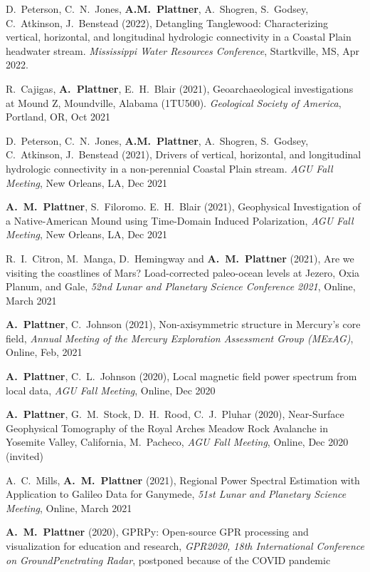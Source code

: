 \documentclass[10pt]{article}
\begin{document}
\spcp D.~Peterson, C.~N.~Jones, \textbf{A.M.~Plattner}, A.~Shogren,
S.~Godsey, C.~Atkinson, J.~Benstead (2022), Detangling Tanglewood:
Characterizing vertical, horizontal, and longitudinal hydrologic
connectivity in a Coastal Plain headwater stream. \emph{Mississippi
Water Resources Conference}, Startkville, MS, Apr 2022.

\spcp R.~Cajigas, \textbf{A.~Plattner}, E.~H.~Blair (2021),
Geoarchaeological investigations at Mound Z, Moundville, Alabama
(1TU500). \emph{Geological Society of America}, Portland, OR, Oct 2021

\spcp D.~Peterson, C.~N.~Jones, \textbf{A.M.~Plattner}, A.~Shogren,
S.~Godsey, C.~Atkinson, J.~Benstead (2021), Drivers of vertical,
horizontal, and longitudinal hydrologic connectivity in a
non-perennial Coastal Plain stream. \emph{AGU Fall Meeting}, New
Orleans, LA, Dec 2021

\spcp \textbf{A.~M.~Plattner}, S.~Filoromo. E.~H.~Blair (2021),
Geophysical Investigation of a Native-American Mound using Time-Domain
Induced Polarization, \emph{AGU Fall Meeting}, New Orleans, LA, Dec
2021

\spcp R.~I.~Citron, M.~Manga, D.~Hemingway and \textbf{A.~M.~Plattner}
(2021), Are we visiting the coastlines of Mars? Load-corrected
paleo-ocean levels at Jezero, Oxia Planum, and Gale, \emph{52nd Lunar
and Planetary Science Conference 2021}, Online, March 2021

\spcp \textbf{A.~Plattner}, C.~Johnson (2021), Non-axisymmetric
structure in Mercury's core field, \emph{Annual Meeting of the Mercury
Exploration Assessment Group (MExAG)}, Online, Feb, 2021

\spcp \textbf{A.~Plattner}, C.~L.~Johnson (2020),
Local magnetic field power spectrum from local data,
\emph{AGU Fall Meeting}, Online, Dec 2020 

\spcp \textbf{A.~Plattner}, G.~M.~Stock, D.~H.~Rood, C.~J.~Pluhar
(2020), Near-Surface Geophysical Tomography of the Royal Arches Meadow
Rock Avalanche in Yosemite Valley, California, M.~Pacheco, \emph{AGU
Fall Meeting}, Online, Dec 2020 (invited)

\spcp A.~C.~Mills, \textbf{A.~M.~Plattner} (2021), Regional Power
Spectral Estimation with Application to Galileo Data for Ganymede,
\emph{51st Lunar and Planetary Science Meeting}, Online, March 2021

\spcp \textbf{A.~M.~Plattner} (2020), GPRPy: Open-source GPR processing
and visualization for education and research, \emph{GPR2020, 18th
International Conference on GroundPenetrating Radar}, postponed
because of the COVID pandemic
\end{document}
